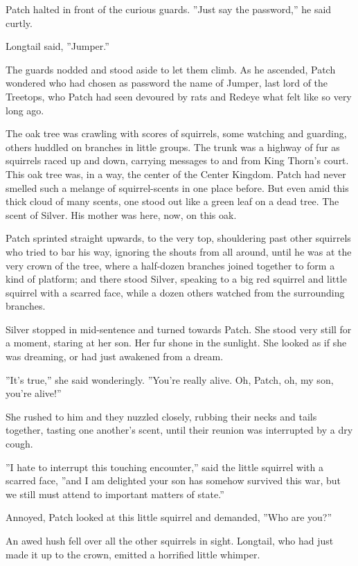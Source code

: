 \documentclass[12pt]{book}
\begin{document}
Patch halted in front of the curious guards. ''Just say the
password,'' he said curtly.

Longtail said, ''Jumper.''

The guards nodded and stood aside to let them climb. As he ascended,
Patch wondered who had chosen as password the name of Jumper, last
lord of the Treetops, who Patch had seen devoured by rats and Redeye
what felt like so very long ago.

The oak tree was crawling with scores of squirrels, some watching and
guarding, others huddled on branches in little groups. The trunk was a
highway of fur as squirrels raced up and down, carrying messages to
and from King Thorn's court. This oak tree was, in a way, the center
of the Center Kingdom. Patch had never smelled such a melange of
squirrel-scents in one place before. But even amid this thick cloud of
many scents, one stood out like a green leaf on a dead tree. The scent
of Silver. His mother was here, now, on this oak.

Patch sprinted straight upwards, to the very top, shouldering past
other squirrels who tried to bar his way, ignoring the shouts from all
around, until he was at the very crown of the tree, where a half-dozen
branches joined together to form a kind of platform; and there stood
Silver, speaking to a big red squirrel and little squirrel with a
scarred face, while a dozen others watched from the surrounding
branches.

Silver stopped in mid-sentence and turned towards Patch. She stood
very still for a moment, staring at her son. Her fur shone in the
sunlight. She looked as if she was dreaming, or had just awakened from
a dream.

''It's true,'' she said wonderingly. ''You're really alive. Oh, Patch,
oh, my son, you're alive!''

She rushed to him and they nuzzled closely, rubbing their necks and
tails together, tasting one another's scent, until their reunion was
interrupted by a dry cough.

''I hate to interrupt this touching encounter,'' said the little
squirrel with a scarred face, ''and I am delighted your son has
somehow survived this war, but we still must attend to important
matters of state.''

Annoyed, Patch looked at this little squirrel and demanded, ''Who are
you?''

An awed hush fell over all the other squirrels in sight. Longtail, who
had just made it up to the crown, emitted a horrified little whimper.
\end{document}
